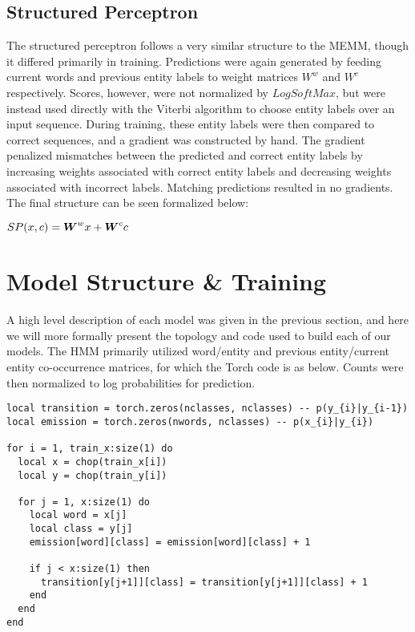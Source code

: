 \documentclass[11pt]{article}
\begin{document}
\subsection{Structured Perceptron}

The structured perceptron follows a very similar structure to the MEMM, though it differed primarily in training. Predictions were again generated by feeding current words and previous entity labels to weight matrices $W^{w}$ and $W^{c}$ respectively. Scores, however, were not normalized by $LogSoftMax$, but were instead used directly with the Viterbi algorithm to choose entity labels over an input sequence. During training, these entity labels were then compared to correct sequences, and a gradient was constructed by hand. The gradient penalized mismatches between the predicted and correct entity labels by increasing weights associated with correct entity labels and decreasing weights associated with incorrect labels. Matching predictions resulted in no gradients. The final structure can be seen formalized below:
\begin{center}
    $SP(x, c) = \boldsymbol{W}^{w}x + \boldsymbol{W}^{c}c$
\end{center}

\section{Model Structure \& Training}

A high level description of each model was given in the previous section, and here we will more formally present the topology and code used to build each of our models. The HMM primarily utilized word/entity and previous entity/current entity co-occurrence  matrices, for which the Torch code is as below. Counts were then normalized to log probabilities for prediction.
\begin{verbatim}
local transition = torch.zeros(nclasses, nclasses) -- p(y_{i}|y_{i-1})
local emission = torch.zeros(nwords, nclasses) -- p(x_{i}|y_{i})

for i = 1, train_x:size(1) do
  local x = chop(train_x[i])
  local y = chop(train_y[i])

  for j = 1, x:size(1) do
    local word = x[j]
    local class = y[j]
    emission[word][class] = emission[word][class] + 1

    if j < x:size(1) then
      transition[y[j+1]][class] = transition[y[j+1]][class] + 1
    end
  end
end
\end{verbatim}
\end{document}
